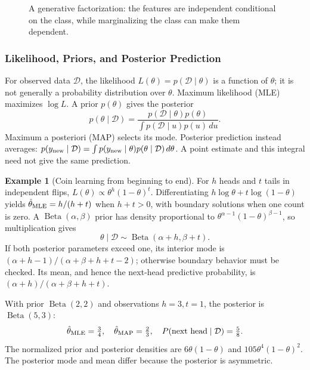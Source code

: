 \documentclass[11pt,twoside]{article}
\numberwithin{equation}{section}
\theoremstyle{plain}
\theoremstyle{definition}
\newtheorem{example}[theorem]{Example}
\theoremstyle{remark}
\begin{document}
\begin{figure}[H]
\centering
{}
\caption{A generative factorization: the features are independent conditional on the class, while marginalizing the class can make them dependent.}
\end{figure}

\subsubsection{Likelihood, Priors, and Posterior Prediction}
For observed data $\mathcal D$, the likelihood $L(\theta)=p(\mathcal D\mid\theta)$ is a function of $\theta$; it is not generally a probability distribution over $\theta$. Maximum likelihood (MLE) maximizes $\log L$. A prior $p(\theta)$ gives the posterior
\[
p(\theta\mid\mathcal D)=\frac{p(\mathcal D\mid\theta)p(\theta)}{\int p(\mathcal D\mid u)p(u)\,du}.
\]
Maximum a posteriori (MAP) selects its mode. Posterior prediction instead averages:
$p(y_{\rm new}\mid\mathcal D)=\int p(y_{\rm new}\mid\theta)p(\theta\mid\mathcal D)\,d\theta$.
A point estimate and this integral need not give the same prediction.

\begin{example}[Coin learning from beginning to end]
For $h$ heads and $t$ tails in independent flips, $L(\theta)\propto\theta^h(1-\theta)^t$. Differentiating $h\log\theta+t\log(1-\theta)$ yields $\hat\theta_{\rm MLE}=h/(h+t)$ when $h+t>0$, with boundary solutions when one count is zero. A $\operatorname{Beta}(\alpha,\beta)$ prior has density proportional to $\theta^{\alpha-1}(1-\theta)^{\beta-1}$, so multiplication gives
\[
\theta\mid\mathcal D\sim\operatorname{Beta}(\alpha+h,\beta+t).
\]
If both posterior parameters exceed one, its interior mode is $(\alpha+h-1)/(\alpha+\beta+h+t-2)$; otherwise boundary behavior must be checked. Its mean, and hence the next-head predictive probability, is $(\alpha+h)/(\alpha+\beta+h+t)$.

With prior $\operatorname{Beta}(2,2)$ and observations $h=3,t=1$, the posterior is $\operatorname{Beta}(5,3)$:
\[
\hat\theta_{\rm MLE}=\tfrac34,\quad
\hat\theta_{\rm MAP}=\tfrac23,\quad
P(\text{next head}\mid\mathcal D)=\tfrac58.
\]
The normalized prior and posterior densities are $6\theta(1-\theta)$ and $105\theta^4(1-\theta)^2$. The posterior mode and mean differ because the posterior is asymmetric.
\end{example}
\end{document}
